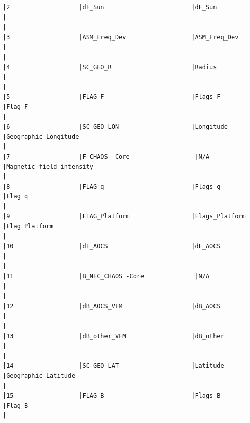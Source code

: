 \begin{verbatim}
|2                   |dF_Sun                        |dF_Sun                        |                                                                                                    |
|3                   |ASM_Freq_Dev                  |ASM_Freq_Dev                  |                                                                                                    |
|4                   |SC_GEO_R                      |Radius                        |                                                                                                    |
|5                   |FLAG_F                        |Flags_F                       |Flag F                                                                                              |
|6                   |SC_GEO_LON                    |Longitude                     |Geographic Longitude                                                                                |
|7                   |F_CHAOS -Core                  |N/A                           |Magnetic field intensity                                                                            |
|8                   |FLAG_q                        |Flags_q                       |Flag q                                                                                              |
|9                   |FLAG_Platform                 |Flags_Platform                |Flag Platform                                                                                       |
|10                  |dF_AOCS                       |dF_AOCS                       |                                                                                                    |
|11                  |B_NEC_CHAOS -Core              |N/A                           |                                                                                                    |
|12                  |dB_AOCS_VFM                   |dB_AOCS                       |                                                                                                    |
|13                  |dB_other_VFM                  |dB_other                      |                                                                                                    |
|14                  |SC_GEO_LAT                    |Latitude                      |Geographic Latitude                                                                                 |
|15                  |FLAG_B                        |Flags_B                       |Flag B                                                                                              |

\end{verbatim}
